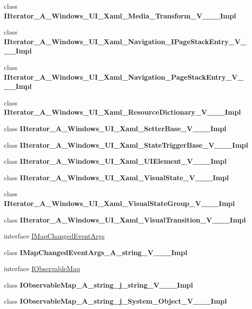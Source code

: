 \begin{DoxyCompactItemize}
\item 
class {\bfseries I\+Iterator\+\_\+\+A\+\_\+\+Windows\+\_\+\+U\+I\+\_\+\+Xaml\+\_\+\+Media\+\_\+\+Transform\+\_\+\+V\+\_\+\+\_\+\+\_\+\+Impl}
\item 
class {\bfseries I\+Iterator\+\_\+\+A\+\_\+\+Windows\+\_\+\+U\+I\+\_\+\+Xaml\+\_\+\+Navigation\+\_\+\+I\+Page\+Stack\+Entry\+\_\+\+V\+\_\+\+\_\+\+\_\+\+Impl}
\item 
class {\bfseries I\+Iterator\+\_\+\+A\+\_\+\+Windows\+\_\+\+U\+I\+\_\+\+Xaml\+\_\+\+Navigation\+\_\+\+Page\+Stack\+Entry\+\_\+\+V\+\_\+\+\_\+\+\_\+\+Impl}
\item 
class {\bfseries I\+Iterator\+\_\+\+A\+\_\+\+Windows\+\_\+\+U\+I\+\_\+\+Xaml\+\_\+\+Resource\+Dictionary\+\_\+\+V\+\_\+\+\_\+\+\_\+\+Impl}
\item 
class {\bfseries I\+Iterator\+\_\+\+A\+\_\+\+Windows\+\_\+\+U\+I\+\_\+\+Xaml\+\_\+\+Setter\+Base\+\_\+\+V\+\_\+\+\_\+\+\_\+\+Impl}
\item 
class {\bfseries I\+Iterator\+\_\+\+A\+\_\+\+Windows\+\_\+\+U\+I\+\_\+\+Xaml\+\_\+\+State\+Trigger\+Base\+\_\+\+V\+\_\+\+\_\+\+\_\+\+Impl}
\item 
class {\bfseries I\+Iterator\+\_\+\+A\+\_\+\+Windows\+\_\+\+U\+I\+\_\+\+Xaml\+\_\+\+U\+I\+Element\+\_\+\+V\+\_\+\+\_\+\+\_\+\+Impl}
\item 
class {\bfseries I\+Iterator\+\_\+\+A\+\_\+\+Windows\+\_\+\+U\+I\+\_\+\+Xaml\+\_\+\+Visual\+State\+\_\+\+V\+\_\+\+\_\+\+\_\+\+Impl}
\item 
class {\bfseries I\+Iterator\+\_\+\+A\+\_\+\+Windows\+\_\+\+U\+I\+\_\+\+Xaml\+\_\+\+Visual\+State\+Group\+\_\+\+V\+\_\+\+\_\+\+\_\+\+Impl}
\item 
class {\bfseries I\+Iterator\+\_\+\+A\+\_\+\+Windows\+\_\+\+U\+I\+\_\+\+Xaml\+\_\+\+Visual\+Transition\+\_\+\+V\+\_\+\+\_\+\+\_\+\+Impl}
\item 
interface \hyperlink{interface_windows_1_1_foundation_1_1_collections_1_1_i_map_changed_event_args}{I\+Map\+Changed\+Event\+Args}
\item 
class {\bfseries I\+Map\+Changed\+Event\+Args\+\_\+\+A\+\_\+string\+\_\+\+V\+\_\+\+\_\+\+\_\+\+Impl}
\item 
interface \hyperlink{interface_windows_1_1_foundation_1_1_collections_1_1_i_observable_map}{I\+Observable\+Map}
\item 
class {\bfseries I\+Observable\+Map\+\_\+\+A\+\_\+string\+\_\+j\+\_\+string\+\_\+\+V\+\_\+\+\_\+\+\_\+\+Impl}
\item 
class {\bfseries I\+Observable\+Map\+\_\+\+A\+\_\+string\+\_\+j\+\_\+\+System\+\_\+\+Object\+\_\+\+V\+\_\+\+\_\+\+\_\+\+Impl}

\end{DoxyCompactItemize}
